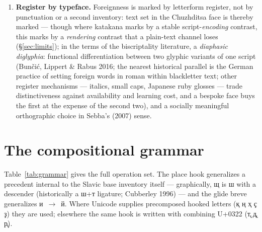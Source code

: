 \documentclass[11pt]{article}
\newcommand{\cz}[1]{{\chu #1}}
\begin{document}
\begin{enumerate}
Three properties must be kept distinct here: that a letter exists in Unicode, that it has established use in \emph{some} Cyrillic orthography, and that it will be transparently interpretable to readers of \emph{any} Cyrillic orthography. This paper demonstrates the first two — a Bulgarian reader has no prior acquaintance with Kazakh \cz{қ} or Bashkir \cz{ҙ}, and importing an attested letter buys typographic and pedagogic precedent, not automatic legibility. The third is the criterion the design aims at, and it remains an empirical claim for the reader study of \S\ref{sec:limits}.
\item \textbf{Register by typeface.} Foreignness is marked by letterform register, not by punctuation or a second inventory: text set in the Chuzhditsa face is thereby marked — though where katakana marks by a stable script-\emph{encoding} contrast, this marks by a \emph{rendering} contrast that a plain-text channel loses (\S\ref{sec:limits}); in the terms of the biscriptality literature, a \emph{diaphasic diglyphia}: functional differentiation between two glyphic variants of one script (Bun\v{c}i\'c, Lippert \& Rabus 2016; the nearest historical parallel is the German practice of setting foreign words in roman within blackletter text; other register mechanisms — italics, small caps, Japanese ruby glosses — trade distinctiveness against availability and learning cost, and a bespoke face buys the first at the expense of the second two), and a socially meaningful orthographic choice in Sebba's (2007) sense.
\end{enumerate}

\section{The compositional grammar}\label{sec:hook}

Table~\ref{tab:grammar} gives the full operation set. The place hook generalizes a precedent internal to the Slavic base inventory itself — graphically, \cz{щ} is \cz{ш} with a descender (historically a \cz{ш}+\cz{т} ligature; Cubberley 1996) — and the glide breve generalizes \cz{и}~$\rightarrow$~\cz{й}. Where Unicode supplies precomposed hooked letters (\cz{қ ң ҳ ҫ ҙ}) they are used; elsewhere the same hook is written with combining U+0322 (\cz{т̢ д̢ р̢}).
\end{document}
